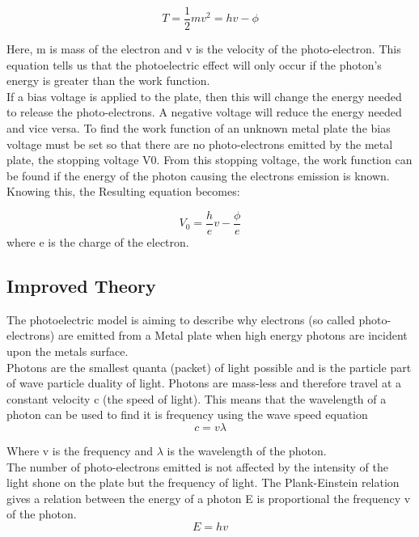 \documentclass[12pt]{article}
\begin{document}
\begin{equation}
    T=\frac{1}{2}mv^{2}=hv-\phi
\end{equation}

Here, m is mass of the electron and v is the velocity of the photo-electron. This equation tells us that the photoelectric effect will only occur if the photon’s energy is greater than the work function.
\\
If a bias voltage is applied to the plate, then this will change the energy needed to release the photo-electrons. A negative voltage will reduce the energy needed and vice versa. To find the work function of an unknown metal plate the bias voltage must be set so that there are no photo-electrons emitted by the metal plate, the stopping voltage V0. From this stopping voltage, the work function can be found if the energy of the photon causing the electrons emission is known. Knowing this, the Resulting equation becomes:

\begin{equation}
    V_{0}=\frac{h}{e}v-\frac{\phi}{e}
\end{equation}
where e is the charge of the electron. 

\subsection{Improved Theory}
The photoelectric model is aiming to describe why electrons (so called photo-electrons) are emitted from a Metal plate when high energy photons  are incident upon the metals surface.\\

Photons are the smallest quanta (packet) of light possible and is the particle part of wave particle duality of light. Photons are mass-less and therefore travel at a constant velocity c (the speed of light). This means that the wavelength of a photon can be used to find it is frequency using the wave
speed equation\\

    \begin{equation}
    c=v\lambda
    \end{equation}
    
Where v is the frequency and $\lambda$ is the wavelength of the photon.\\

The number of photo-electrons emitted is not affected by the intensity of the light shone on the plate but the frequency of light. The Plank-Einstein relation gives a relation between the energy of a photon E is proportional the frequency v of the photon. \cite{statistical mechanics}
 \begin{equation}
     E=hv
 \end{equation}
 
\end{document}
